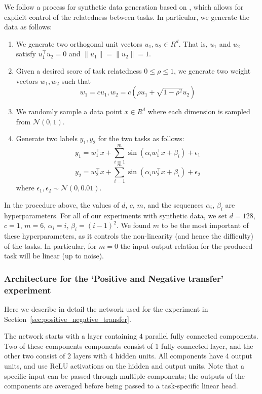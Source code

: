 \documentclass[conference]{IEEEtran}
\begin{document}
We follow a process for synthetic data generation based on \cite{MMoE-KDD-2018}, which allows for explicit control of the relatedness between tasks. In particular, we generate the data as follows:
\begin{enumerate}
\item We generate two orthogonal unit vectors $u_1, u_2 \in R^d$. That is, $u_1$ and $u_2$ satisfy $u_1 ^\top u_2 = 0$ and $\|u_1\| = \|u_2\| = 1$.
\item Given a desired score of task relatedness $0 \leq \rho \leq 1 $, we generate two weight vectors $w_1, w_2$ such that
\begin{equation}
    w_1 = c u_1, w_2 = c(\rho u_1 + \sqrt{1-\rho^2} u_2)
\end{equation}
\item We randomly sample a data point $x \in R^d$ where each dimension is sampled from $\mathcal{N}(0,1)$.
\item Generate two labels $y_1, y_2$ for the two tasks as follows:
\begin{equation}
y_1 = w_1^\top x + \sum_{i=1}^m \sin(\alpha_i w_1^\top x + \beta_i) + \epsilon_1
\end{equation}
\begin{equation}
y_2 = w_2^\top x + \sum_{i=1}^m \sin(\alpha_i w_2^\top x + \beta_i) + \epsilon_2
\end{equation}
where $\epsilon_1, \epsilon_2 \sim \mathcal{N}(0, 0.01)$.
\end{enumerate}

In the procedure above, the values of $d$, $c$, $m$, and the sequences $\alpha_i$, $\beta_i$ are hyperparameters. For all of our experiments with synthetic data, we set $d = 128$, $c=1$, $m = 6$, $\alpha_i = i$, $\beta_i = (i - 1)^2$. We found $m$ to be the most important of these hyperparameters, as it controls the non-linearity (and hence the difficulty) of the tasks. In particular, for $m = 0$ the input-output relation for the produced task will be linear (up to noise).

\subsubsection{Architecture for the `Positive and Negative transfer' experiment}\label{appendix:positive_negative_transfer_arch}

Here we describe in detail the network used for the experiment in Section~\ref{sec:positive_negative_transfer}.

The network starts with a layer containing $4$ parallel fully connected components. Two of these components components consist of 1 fully connected layer, and the other two consist of 2 layers with $4$ hidden units. All components have $4$ output units, and use ReLU activations on the hidden and output units. Note that a specific input can be passed through multiple components; the outputs of the components are averaged before being passed to a task-specific linear head.
\end{document}
